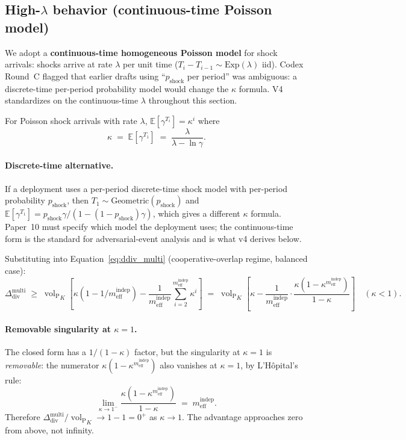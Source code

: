 \documentclass{article}
\DeclareMathOperator{\vol}{vol}
\newcommand{\volL}{{\vol_{\mathrm{P}}}}
\newcommand{\mindep}{m_{\mathrm{eff}}^{\mathrm{indep}}}
\newcommand{\Ddiv}{\Delta_{\mathrm{div}}}
\newcommand{\pshock}{p_{\mathrm{shock}}}
\begin{document}
\subsection{High-$\lambda$ behavior (continuous-time Poisson model)}

We adopt a \textbf{continuous-time homogeneous Poisson model} for
shock arrivals: shocks arrive at rate $\lambda$ per unit time
($T_i - T_{i-1} \sim \mathrm{Exp}(\lambda)$ iid).  Codex Round~C
flagged that earlier drafts using ``$\pshock$ per period'' was
ambiguous: a discrete-time per-period probability model would change
the $\kappa$ formula.  V4 standardizes on the continuous-time
$\lambda$ throughout this section.

For Poisson shock arrivals with rate $\lambda$,
$\mathbb{E}[\gamma^{T_i}] = \kappa^i$ where
\[
  \kappa \;=\; \mathbb{E}[\gamma^{T_1}] \;=\;
  \frac{\lambda}{\lambda - \ln \gamma}.
\]

\paragraph{Discrete-time alternative.}
If a deployment uses a per-period discrete-time shock model with
per-period probability $\pshock$, then $T_1 \sim \mathrm{Geometric}(\pshock)$
and $\mathbb{E}[\gamma^{T_1}] = \pshock \gamma / (1 - (1-\pshock)\gamma)$,
which gives a different $\kappa$ formula.  Paper~10 must specify
which model the deployment uses; the continuous-time form is the
standard for adversarial-event analysis and is what v4 derives below.

Substituting into Equation~\ref{eq:ddiv_multi} (cooperative-overlap
regime, balanced case):
\[
  \Ddiv^{\mathrm{multi}}
  \;\geq\; \volL_K \left[\kappa (1 - 1/\mindep)
   - \frac{1}{\mindep} \sum_{i=2}^{\mindep} \kappa^i\right]
  \;=\; \volL_K \left[\kappa - \frac{1}{\mindep}
   \cdot \frac{\kappa(1 - \kappa^{\mindep})}{1 - \kappa}\right]
  \quad (\kappa < 1).
\]

\paragraph{Removable singularity at $\kappa = 1$.}
The closed form has a $1/(1 - \kappa)$ factor, but the singularity at
$\kappa = 1$ is \emph{removable}: the numerator
$\kappa(1 - \kappa^{\mindep})$ also vanishes at $\kappa = 1$, by
L'H\^opital's rule:
\[
  \lim_{\kappa \to 1^{-}} \frac{\kappa(1 - \kappa^{\mindep})}{1 - \kappa}
  \;=\; \mindep.
\]
Therefore $\Ddiv^{\mathrm{multi}} / \volL_K \to 1 - 1 = 0^+$ as
$\kappa \to 1$.  The advantage approaches zero from above, not
infinity.
\end{document}
